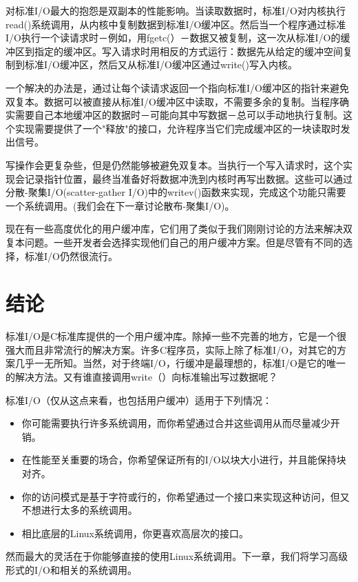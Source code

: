 对标准I/O最大的抱怨是双副本的性能影响。当读取数据时，标准I/O对内核执行read()系统调用，从内核中复制数据到标准I/O缓冲区。然后当一个程序通过标准I/O执行一个读请求时－例如，用fgetc(）－数据又被复制，这一次从标准I/O的缓冲区到指定的缓冲区。写入请求时用相反的方式运行：数据先从给定的缓冲空间复制到标准I/O缓冲区，然后又从标准I/O缓冲区通过write()写入内核。

一个解决的办法是，通过让每个读请求返回一个指向标准I/O缓冲区的指针来避免双复本。数据可以被直接从标准I/O缓冲区中读取，不需要多余的复制。当程序确实需要自己本地缓冲区的数据时－可能向其中写数据－总可以手动地执行复制。这个实现需要提供了一个"释放"的接口，允许程序当它们完成缓冲区的一块读取时发出信号。

写操作会更复杂些，但是仍然能够被避免双复本。当执行一个写入请求时，这个实现会记录指针位置，最终当准备好将数据冲洗到内核时再写出数据。这些可以通过分散-聚集I/O(scatter-gather I/O)中的writev()函数来实现，完成这个功能只需要一个系统调用。(我们会在下一章讨论散布-聚集I/O)。

现在有一些高度优化的用户缓冲库，它们用了类似于我们刚刚讨论的方法来解决双复本问题。一些开发者会选择实现他们自己的用户缓冲方案。但是尽管有不同的选择，标准I/O仍然很流行。

\section{结论}

标准I/O是C标准库提供的一个用户缓冲库。除掉一些不完善的地方，它是一个很强大而且非常流行的解决方案。许多C程序员，实际上除了标准I/O，对其它的方案几乎一无所知。当然，对于终端I/O，行缓冲是最理想的，标准I/O是它的唯一的解决方法。又有谁直接调用write（）向标准输出写过数据呢？

标准I/O（仅从这点来看，也包括用户缓冲）适用于下列情况：

\begin{itemize}
\item 你可能需要执行许多系统调用，而你希望通过合并这些调用从而尽量减少开销。
\item 在性能至关重要的场合，你希望保证所有的I/O以块大小进行，并且能保持块对齐。
\item 你的访问模式是基于字符或行的，你希望通过一个接口来实现这种访问，但又不想进行太多的系统调用。
\item 相比底层的Linux系统调用，你更喜欢高层次的接口。
\end{itemize}

然而最大的灵活在于你能够直接的使用Linux系统调用。下一章，我们将学习高级形式的I/O和相关的系统调用。 
